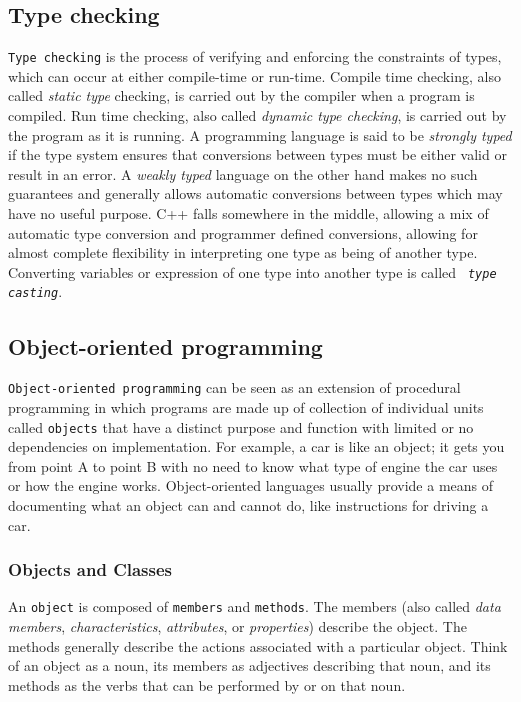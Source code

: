 \subsection{Type checking}
\texttt{Type checking} is the process of verifying and enforcing the
constraints of types, which can occur at either compile-time or run-time.
Compile time checking, also called \textit{static type} checking, is carried out
by the compiler when a program is compiled. Run time checking, also
called \textit{dynamic type checking}, is carried out by the program as it is
running. A programming language is said to be \textit{strongly typed} if the
type system ensures that conversions between types must be either valid or
result in an error. A \textit{weakly typed} language on the other hand makes no
such guarantees and generally allows automatic conversions between types which
may have no useful purpose. C++ falls somewhere in the middle, allowing a mix
of automatic type conversion and programmer defined conversions, allowing for
almost complete flexibility in interpreting one type as being of another type.
Converting variables or expression of one type into another type is
called \texttt{ \textit{type casting}}.

\subsection{Object-oriented programming}
\texttt{Object-oriented programming} can be seen
as an extension of procedural programming in which programs are made up of
collection of individual units called \texttt{objects} that have a distinct
purpose and function with limited or no dependencies on
implementation. For example, a car is like an object; it gets
you from point A to point B with no need to know what type of engine the car
uses or how the engine works. Object-oriented languages usually provide a means
of documenting what an object can and cannot do, like
instructions for driving a car.

\subsubsection{Objects and Classes}
An \texttt{object} is composed of \texttt{members} and \texttt{methods}. The
members (also called \textit{data members}, \textit{characteristics},
\textit{attributes}, or \textit{properties}) describe the object. The methods
generally describe the actions associated with a particular object. Think of an
object as a noun, its members as adjectives describing that noun, and its
methods as the verbs that can be performed by or on that noun.

